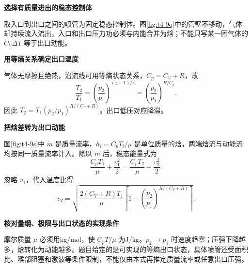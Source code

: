 \begin{solution}\textbf{选择有质量进出的稳态控制体}\par\nobreak
取入口到出口之间的喷管为固定稳态控制体。图\ref{fig:t4-9q}中的管壁不移动，气体却持续流入流出，入口和出口压力功必须与内能合并为焓；不能只写某一团气体的 $C_V\Delta T$ 等于出口动能。


\par\medskip{}\noindent\textbf{用等熵关系确定出口温度}\par\nobreak
气体无摩擦且绝热，沿流线可用等熵状态关系，$C_p=C_V+R$，故
\[\frac{T_2}{T_1}=\left(\frac{p_2}{p_1}\right)^{(\gamma-1)/\gamma}
=\left(\frac{p_2}{p_1}\right)^{R/C_p}.\]
因此 $\boxed{T_2=T_1(p_2/p_1)^{R/(C_V+R)}}$。出口低压对应降温。



\par\medskip{}\noindent\textbf{把焓差转为出口动能}\par\nobreak
图\ref{fig:t4-9s}中 $\dot m$ 是质量流率，$h_i=C_pT_i/\mu$ 是单位质量的焓，两端焓流与动能流均按同一质量流率计入。除以 $\dot m$ 后，稳态能量式为
\[\frac{C_pT_1}{\mu}+\frac{v_1^2}{2}=\frac{C_pT_2}{\mu}+\frac{v_2^2}{2}.\]
忽略 $v_1$，代入温度比得
\[\boxed{v_2=\sqrt{\frac{2(C_V+R)T_1}{\mu}
\left[1-\left(\frac{p_2}{p_1}\right)^{R/(C_V+R)}\right]}}.\]


\par\medskip{}\noindent\textbf{核对量纲、极限与出口状态的实现条件}\par\nobreak
摩尔质量 $\mu$ 必须用kg/mol，使 $C_pT/\mu$ 为J/kg。$p_2\to p_1$ 时速度趋零；压强下降越多，焓转化为动能越多。题目给定的是可实现的等熵出口状态，具体喷管还受面积比、喉部阻塞和激波等条件限制，不能仅由本式再推定质量流率或任意出口压强。
\end{solution}

